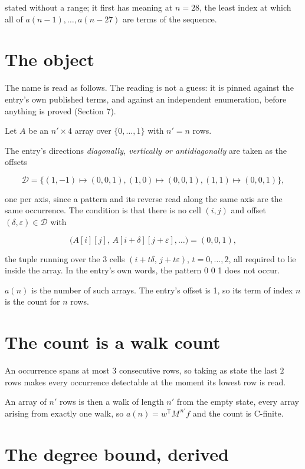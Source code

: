 \documentclass[11pt]{article}
\theoremstyle{definition}
\begin{document}
stated without a range; it first has meaning at $n = 28$, the least index at which all of $a(n-1),\dots,a(n-27)$ are terms of the sequence.

\section{The object}

The name is read as follows. The reading is not a guess: it is pinned against the entry's own published terms, and against an independent enumeration, before anything is proved (Section 7).

Let $A$ be an $n' \times 4$ array over $\{0,\dots,1\}$ with $n' = n$ rows.

The entry's directions {\itshape diagonally, vertically or antidiagonally} are taken as the offsets

\[\mathcal{D} = \{(1,-1)\mapsto(0,0,1), (1,0)\mapsto(0,0,1), (1,1)\mapsto(0,0,1)\},\]

one per axis, since a pattern and its reverse read along the same axis are the same occurrence. The condition is that there is no cell $(i,j)$ and offset $(\delta,\varepsilon)\in\mathcal{D}$ with

\[\bigl(A[i][j],\,A[i{+}\delta][j{+}\varepsilon],\dots\bigr) = (0, 0, 1),\]

the tuple running over the $3$ cells $(i+t\delta,\,j+t\varepsilon)$, $t = 0,\dots,2$, all required to lie inside the array. In the entry's own words, the pattern 0 0 1 does not occur.

$a(n)$ is the number of such arrays. The entry's offset is 1, so its term of index $n$ is the count for $n$ rows.

\section{The count is a walk count}

An occurrence spans at most $3$ consecutive rows, so taking as state the last $2$ rows makes every occurrence detectable at the moment its lowest row is read.

An array of $n'$ rows is then a walk of length $n'$ from the empty state, every array arising from exactly one walk, so $a(n) = w^{\mathsf T}M^{\,n'}f$ and the count is C-finite.

\section{The degree bound, derived}
\end{document}
